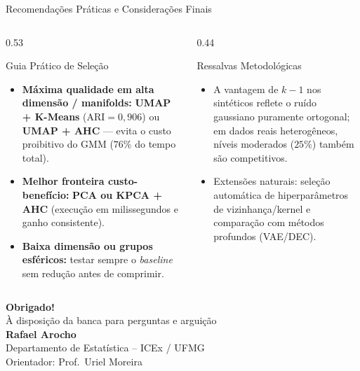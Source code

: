 \documentclass[aspectratio=169,11pt]{beamer}
\begin{document}
\begin{frame}{Recomendações Práticas e Considerações Finais}
  \begin{columns}[T]
    \begin{column}{0.53\textwidth}
      \begin{block}{Guia Prático de Seleção}
        \footnotesize
        \begin{itemize}
          \item \textbf{Máxima qualidade em alta dimensão / manifolds:}
                \textbf{UMAP + K-Means} ($\text{ARI} = 0{,}906$) ou
                \textbf{UMAP + AHC} — evita o custo proibitivo do GMM ($76\%$
                do tempo total).
          \item \textbf{Melhor fronteira custo-benefício:}
                \textbf{PCA ou KPCA + AHC} (execução em milissegundos e ganho
                consistente).
          \item \textbf{Baixa dimensão ou grupos esféricos:} testar sempre o
                \textit{baseline} sem redução antes de comprimir.
        \end{itemize}
      \end{block}
    \end{column}
    \begin{column}{0.44\textwidth}
      \begin{alertblock}{Ressalvas Metodológicas}
        \footnotesize
        \begin{itemize}
          \item A vantagem de $k-1$ nos sintéticos reflete o ruído gaussiano
                puramente ortogonal; em dados reais heterogêneos, níveis
                moderados ($25\%$) também são competitivos.
          \item Extensões naturais: seleção automática de hiperparâmetros de
                vizinhança/kernel e comparação com métodos profundos (VAE/DEC).
        \end{itemize}
      \end{alertblock}
    \end{column}
  \end{columns}
\end{frame}

\begin{frame}
  \centering
  \vspace*{2.0cm}
  {\Huge \textcolor{ufmgblue}{\textbf{Obrigado!}}}\\[1.0em]
  {\large À disposição da banca para perguntas e arguição}\\[2.0em]
  {\normalsize \textbf{Rafael Arocho}}\\
  {\small Departamento de Estatística -- ICEx / UFMG}\\
  {\small Orientador: Prof.\ Uriel Moreira}
\end{frame}
\end{document}
